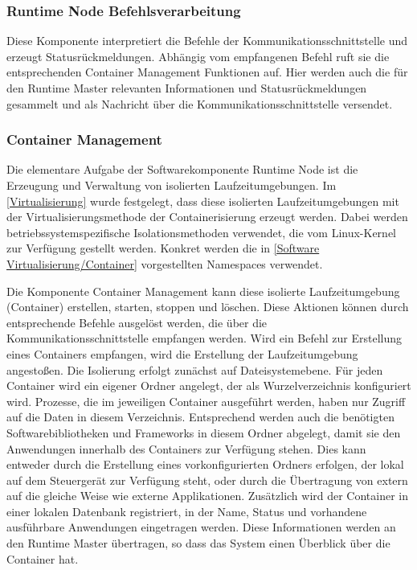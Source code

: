 \subsubsection{Runtime Node Befehlsverarbeitung}

Diese Komponente interpretiert die Befehle der Kommunikationsschnittstelle und erzeugt Statusrückmeldungen. Abhängig vom empfangenen Befehl ruft sie die entsprechenden Container Management Funktionen auf. Hier werden auch die für den Runtime Master relevanten Informationen und Statusrückmeldungen gesammelt und als Nachricht über die Kommunikationsschnittstelle versendet.

\subsubsection{Container Management}
\label{Container Management}

Die elementare Aufgabe der Softwarekomponente Runtime Node ist die Erzeugung und Verwaltung von isolierten Laufzeitumgebungen. Im \autoref{Virtualisierung} wurde festgelegt, dass diese isolierten Laufzeitumgebungen mit der Virtualisierungsmethode der Containerisierung erzeugt werden. Dabei werden betriebssystemspezifische Isolationsmethoden verwendet, die vom Linux-Kernel zur Verfügung gestellt werden. Konkret werden die in \autoref{Software Virtualisierung/Container} vorgestellten Namespaces verwendet. 

Die Komponente Container Management kann diese isolierte Laufzeitumgebung (Container) erstellen, starten, stoppen und löschen. Diese Aktionen können durch entsprechende Befehle ausgelöst werden, die über die Kommunikationsschnittstelle empfangen werden. Wird ein Befehl zur Erstellung eines Containers empfangen, wird die Erstellung der Laufzeitumgebung angestoßen. Die Isolierung erfolgt zunächst auf Dateisystemebene. Für jeden Container wird ein eigener Ordner angelegt, der als Wurzelverzeichnis konfiguriert wird. Prozesse, die im jeweiligen Container ausgeführt werden, haben nur Zugriff auf die Daten in diesem Verzeichnis. Entsprechend werden auch die benötigten Softwarebibliotheken und Frameworks in diesem Ordner abgelegt, damit sie den Anwendungen innerhalb des Containers zur Verfügung stehen. Dies kann entweder durch die Erstellung eines vorkonfigurierten Ordners erfolgen, der lokal auf dem Steuergerät zur Verfügung steht, oder durch die Übertragung von extern auf die gleiche Weise wie externe Applikationen. Zusätzlich wird der Container in einer lokalen Datenbank registriert, in der Name, Status und vorhandene ausführbare Anwendungen eingetragen werden. Diese Informationen werden an den Runtime Master übertragen, so dass das System einen Überblick über die Container hat.

